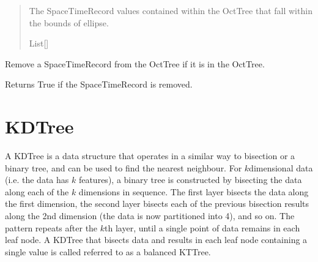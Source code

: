 \documentclass[letterpaper,10pt,english]{sphinxmanual}
\begin{document}
\begin{fulllineitems}
\begin{fulllineitems}
\begin{quote}
\begin{description}
\sphinxAtStartPar
The SpaceTimeRecord values contained within the OctTree that fall
within the bounds of ellipse.

\sphinxAtStartPar
List{[}{\hyperref[\detokenize{record:GeoSpatialTools.record.SpaceTimeRecord}]{}}{]}

\end{description}\end{quote}

\end{fulllineitems}


\begin{fulllineitems}
\label{\detokenize{octtree:GeoSpatialTools.octtree.OctTree.remove}}
\pysigstartsignatures
\pysiglinewithargsret
{}
{}
{}
\pysigstopsignatures
\sphinxAtStartPar
Remove a SpaceTimeRecord from the OctTree if it is in the OctTree.

\sphinxAtStartPar
Returns True if the SpaceTimeRecord is removed.
\begin{quote}\begin{description}
\sphinxAtStartPar
{}

\end{description}\end{quote}

\end{fulllineitems}


\end{fulllineitems}


\sphinxstepscope


\chapter{K\sphinxhyphen{}D\sphinxhyphen{}Tree}
\label{\detokenize{kdtree:k-d-tree}}\label{\detokenize{kdtree::doc}}
\sphinxAtStartPar
A K\sphinxhyphen{}D\sphinxhyphen{}Tree is a data structure that operates in a similar way to bisection or a binary tree, and can be used to find the
nearest neighbour. For \(k\)\sphinxhyphen{}dimensional data (i.e. the data has \(k\) features), a binary tree is constructed
by bisecting the data along each of the \(k\) dimensions in sequence. The first layer bisects the data along the
first dimension, the second layer bisects each of the previous bisection results along the 2nd dimension (the data is
now partitioned into 4), and so on. The pattern repeats after the \(k\)\sphinxhyphen{}th layer, until a single point of data
remains in each leaf node. A K\sphinxhyphen{}D\sphinxhyphen{}Tree that bisects data and results in each leaf node containing a single value is
called referred to as a balanced K\sphinxhyphen{}T\sphinxhyphen{}Tree.
\end{document}
